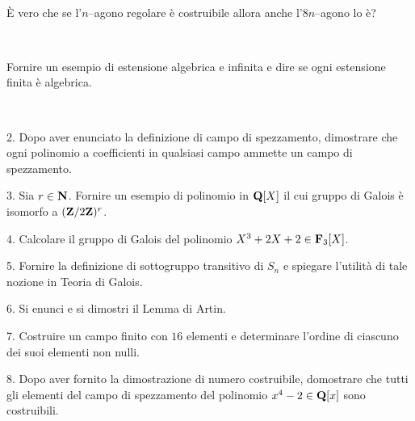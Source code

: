 \ \dotfill\ \bigskip\bigskip\bigskip\vfil

 \`E vero che se l'$n$--agono regolare \`e costruibile allora anche
l'$8n$--agono lo \`e?\medskip\bigskip\bigskip

\ \dotfill\ \bigskip\bigskip\bigskip

 Fornire un esempio di estensione algebrica e infinita e dire se ogni estensione finita \`e algebrica.\medskip\bigskip\bigskip

\ \dotfill\ \bigskip\bigskip\bigskip

\vfil\eject

\item{2.} Dopo aver enunciato la definizione di campo di spezzamento, dimostrare 
che ogni polinomio a coefficienti in qualsiasi campo ammette un campo di spezzamento.
\vv


\item{3.} Sia $r\in{\bf N}$. Fornire un esempio di polinomio in ${\bf Q}[X]$ il cui gruppo di Galois
\`e isomorfo a $({\bf Z}/2{\bf Z})^r$.\ve\ \vs

\item{4.} Calcolare il gruppo di Galois del polinomio $X^3+2X+2\in{\bf F}_3[X]$. \vv

\item{5.} Fornire la definizione di sottogruppo transitivo di $S_n$ e spiegare l'utilit\`a di
tale nozione in Teoria di Galois.
\ve\ \vs

\item{6.} Si enunci e si dimostri il Lemma di Artin.\vskip 6cm\bigskip\bigskip\bigskip\vv\vv

\item{7.} Costruire un campo finito con $16$ elementi e determinare l'ordine di ciascuno dei suoi elementi non nulli.\vskip 6cm\bigskip\bigskip\bigskip\vv\vv

\item{8.} Dopo aver fornito la dimostrazione di numero costruibile, domostrare che tutti gli elementi del campo di spezzamento del polinomio $x^4-2\in{\bf Q}[x]$
sono costruibili.


\vv

\ \vst
 \bye
